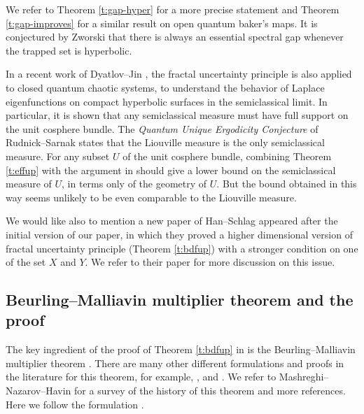 \documentclass[reqno,12pt,letterpaper]{amsart}
\numberwithin{equation}{section}
\numberwithin{prop}{section}
\begin{document}
We refer to Theorem \ref{t:gap-hyper} for a more precise statement and Theorem \ref{t:gap-improves} for a similar result on open quantum baker's maps. It is conjectured by Zworski \cite{zworski} that there is always an essential spectral gap whenever the trapped set is hyperbolic. 

In a recent work of Dyatlov--Jin \cite{messupp}, the fractal uncertainty principle is also applied to closed quantum chaotic systems, to understand the behavior of Laplace eigenfunctions on compact hyperbolic surfaces in the semiclassical limit. In particular, it is shown that any semiclassical measure must have full support on the unit cosphere bundle. The \emph{Quantum Unique Ergodicity Conjecture} of Rudnick--Sarnak \cite{que} states that the Liouville measure is the only semiclassical measure. For any subset $U$ of the unit cosphere bundle, combining Theorem \ref{t:effup} with the argument in \cite{messupp} should give a lower bound on the semiclassical measure of $U$, in terms only of the geometry of $U$. But the bound obtained in this way seems unlikely to be even comparable to the Liouville measure.

We would like also to mention a new paper of Han--Schlag \cite{hdfup} appeared after the initial version of our paper, in which they proved a higher dimensional version of fractal uncertainty principle (Theorem \ref{t:bdfup}) with a stronger condition on one of the set $X$ and $Y$. We refer to their paper for more discussion on this issue.  


\subsection{Beurling--Malliavin multiplier theorem and the proof}
\label{s:bmm}



The key ingredient of the proof of Theorem \ref{t:bdfup} in \cite{fullgap} is the  Beurling--Malliavin multiplier theorem \cite{bmm}. There are many other different formulations and proofs in the literature for this theorem, for example, \cite{malliavin}, \cite{koosis} and \cite{bm7}. We refer to Mashreghi--Nazarov--Havin \cite{bm7} for a survey of the history of this theorem and more references. Here we follow the formulation \cite[Theorem BM1]{bm7}.
\end{document}

